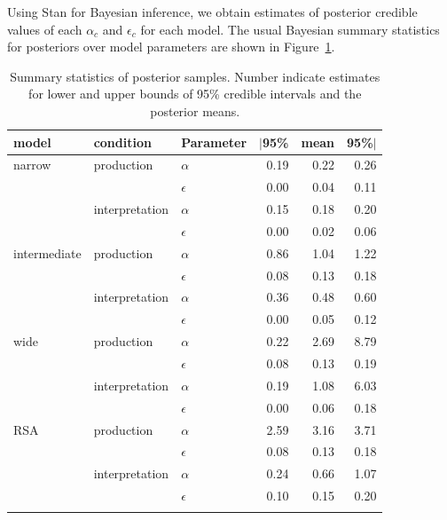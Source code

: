 \documentclass{article}
\begin{document}
Using Stan \citep{Team2023:The-Stan-Core-L} for Bayesian inference, we obtain estimates of posterior credible values of each $\alpha_{c}$ and $\epsilon_{c}$ for each model.
The usual Bayesian summary statistics for posteriors over model parameters are shown in Figure~\ref{fig:posterior-stats}.

\begin{table}[ht]
  \centering


  \begin{tabular}{lllrrr}
    \toprule \addlinespace[1ex]
    model        & condition      & Parameter  & $|$95\% & mean & 95\%$|$ \\
    \midrule  \addlinespace[1ex]
    narrow       & production     & $\alpha$   & 0.19    & 0.22 & 0.26 \\
                 &                & $\epsilon$ & 0.00    & 0.04 & 0.11 \\
                 & interpretation & $\alpha$   & 0.15    & 0.18 & 0.20 \\
                 &                & $\epsilon$ & 0.00    & 0.02 & 0.06 \\ \addlinespace[0.75ex]
    intermediate & production     & $\alpha$   & 0.86    & 1.04 & 1.22 \\
                 &                & $\epsilon$ & 0.08    & 0.13 & 0.18 \\
                 & interpretation & $\alpha$   & 0.36    & 0.48 & 0.60 \\
                 &                & $\epsilon$ & 0.00    & 0.05 & 0.12 \\ \addlinespace[0.75ex]
    wide         & production     & $\alpha$   & 0.22    & 2.69 & 8.79 \\
                 &                & $\epsilon$ & 0.08    & 0.13 & 0.19 \\
                 & interpretation & $\alpha$   & 0.19    & 1.08 & 6.03 \\
                 &                & $\epsilon$ & 0.00    & 0.06 & 0.18 \\ \addlinespace[0.75ex]
    RSA          & production     & $\alpha$   & 2.59    & 3.16 & 3.71 \\
                 &                & $\epsilon$ & 0.08    & 0.13 & 0.18 \\
                 & interpretation & $\alpha$   & 0.24    & 0.66 & 1.07 \\
                 &                & $\epsilon$ & 0.10    & 0.15 & 0.20 \\ \addlinespace[0.25ex]
    \bottomrule \\
  \end{tabular}

  \caption{
    Summary statistics of posterior samples.
    Number indicate estimates for lower and upper bounds of 95\% credible intervals and the posterior means.
  }
  \label{fig:posterior-stats}
\end{table}
\end{document}
